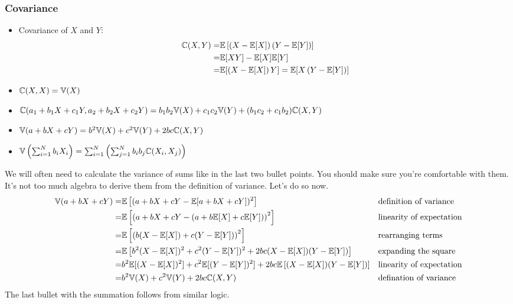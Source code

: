 \begin{frame} \frametitle{Covariance}
  \begin{itemize}
  \item \alert{Covariance} of $X$ and $Y$: 
    \begin{align*} 
      \mathbb{C}(X,Y) = & \mathbb{E}\left[
        \left(X - \mathbb{E}[X] \right) \left(Y - \mathbb{E}[Y] \right) \right] \\ 
      = & \mathbb{E}[X Y] - \mathbb{E}[X] \mathbb{E}[Y] \\
      = & \mathbb{E}[\left(X - \mathbb{E}[X]\right)Y] = \mathbb{E}[X\left(Y - \mathbb{E}[Y]\right)] 
    \end{align*}
  \item $\mathbb{C}(X,X) = \mathbb{V}(X)$
  \item $\mathbb{C}(a_1 + b_1 X + c_1 Y, a_2 + b_2 X + c_2 Y) = b_1 b_2
    \mathbb{V}(X) + c_1 c_2 \mathbb{V}(Y) + (b_1 c_2 + c_1 b_2 ) \mathbb{C}(X, Y)$
  \item $\mathbb{V}(a + bX + cY) =  b^2 \mathbb{V}(X) + c^2\mathbb{V}(Y) + 2bc
    \mathbb{C}(X,Y)$
  \item $\mathbb{V}\left(\sum_{i=1}^N b_i X_i \right) = \sum_{i=1}^N
    \left(\sum_{j=1}^N b_i b_j \mathbb{C}(X_i,X_j) \right)$
  \end{itemize}
\end{frame}

We will often need to calculate the variance of sums like in the last two
bullet points. You should make sure you're comfortable with them. It's
not too much algebra to derive them from the definition of
variance. Let's do so now. 
\begin{align*}
  \mathbb{V}(a + bX + cY) = & \mathbb{E}\left[(a+bX+cY - \mathbb{E}[a + bX + cY])^2\right]
  && \text{definition of variance} \\
  = & \mathbb{E}\left[\left(a+bX+cY - (a + b\mathbb{E}[X] + c\mathbb{E}[Y])\right)^2 \right]
  && \text{linearity of expectation} \\
  = & \mathbb{E}\left[ \left( b (X - \mathbb{E}[X]) + c(Y - \mathbb{E}[Y]) \right)^2\right]
  && \text{rearranging terms} \\
  = & \mathbb{E}\left[ b^2 (X - \mathbb{E}[X])^2 + c^2(Y - \mathbb{E}[Y])^2 +
      2bc(X-\mathbb{E}[X])(Y-\mathbb{E}[Y]) \right] && \text{expanding the square}
  \\ 
  = & b^2 \mathbb{E}[(X- \mathbb{E}[X])^2] + c^2 \mathbb{E}[(Y - \mathbb{E}[Y])^2] + 2bc
      \mathbb{E}\left[(X-\mathbb{E}[X])(Y-\mathbb{E}[Y]) \right] 
  && \text{linearity of expectation} \\
  = & b^2 \mathbb{V}(X) + c^2 \mathbb{V}(Y) + 2bc \mathbb{C}(X,Y) 
  && \text{defination of variance}
\end{align*}
The last bullet with the summation follows from similar logic. 


